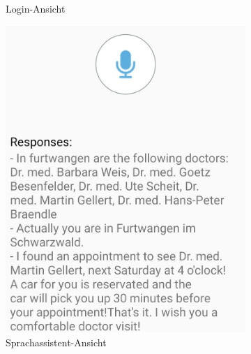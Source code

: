 \begin{figure}[!ht]
\begin{subfigure}[t]{0.48\linewidth}
		\caption{Login-Ansicht}
		\label{fig:prototyp1}
	\end{subfigure}
	\bigskip 
	\begin{subfigure}[t]{0.48\linewidth}
		\centering
		\includegraphics[width=1\linewidth]{Picture/MobileApp_Screenshot-3}
		\caption{Sprachassistent-Ansicht}
		\label{fig:prototyp3}
	\end{subfigure}
	\begin{subfigure}[t]{0.48\linewidth}
		\centering

\end{subfigure}
\end{figure}
